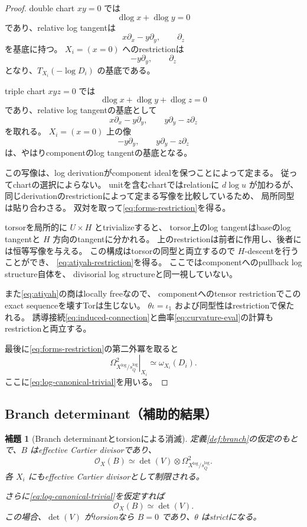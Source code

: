 \documentclass[uplatex,dvipdfmx,11pt]{jsarticle}
\numberwithin{equation}{section}
\theoremstyle{plain}
\newtheorem{lemma}[theorem]{補題}
\theoremstyle{definition}
\theoremstyle{remark}
\DeclareMathOperator{\dlog}{dlog}
\newcommand{\OO}{\mathcal O}
\newcommand{\restr}[2]{\left.#1\right|_{#2}}
\begin{document}
\begin{proof}
double chart \(xy=0\) では
\[
\dlog x+\dlog y=0
\]
であり、relative log tangentは
\[
x\partial_x-y\partial_y,\qquad\partial_z
\]
を基底に持つ。
\(X_i=(x=0)\) へのrestrictionは
\[
-y\partial_y,\qquad\partial_z
\]
となり、\(T_{X_i}(-\log D_i)\) の基底である。

triple chart \(xyz=0\) では
\[
\dlog x+\dlog y+\dlog z=0
\]
であり、relative log tangentの基底として
\[
x\partial_x-y\partial_y,\qquad
y\partial_y-z\partial_z
\]
を取れる。
\(X_i=(x=0)\) 上の像
\[
-y\partial_y,\qquad
y\partial_y-z\partial_z
\]
は、やはりcomponentのlog tangentの基底となる。

この写像は、log derivationがcomponent idealを保つことによって定まる。
従ってchartの選択によらない。
unitを含むchartではrelationに \(d\log u\) が加わるが、
同じderivationのrestrictionによって定まる写像を比較しているため、
局所同型は貼り合わさる。
双対を取って\eqref{eq:forms-restriction}を得る。

torsorを局所的に \(U\times H\) とtrivializeすると、
torsor上のlog tangentはbaseのlog tangentと \(H\) 方向のtangentに分かれる。
上のrestrictionは前者に作用し、後者には恒等写像を与える。
この構成はtorsorの同型と両立するので \(H\)-descentを行うことができ、
\eqref{eq:atiyah-restriction}を得る。
ここではcomponentへのpullback log structure自体を、
divisorial log structureと同一視していない。

また\eqref{eq:atiyah}の商はlocally freeなので、
componentへのtensor restrictionでこのexact sequenceを壊すTorは生じない。
\(\theta\iota=\iota_1\) および同型性はrestrictionで保たれる。
誘導接続\eqref{eq:induced-connection}と曲率\eqref{eq:curvature-eval}の計算も
restrictionと両立する。

最後に\eqref{eq:forms-restriction}の第二外冪を取ると
\[
\restr{\Omega^2_{X^{\log}/s_Q^{\log}}}{X_i}
\simeq\omega_{X_i}(D_i).
\]
ここに\eqref{eq:log-canonical-trivial}を用いる。
\end{proof}

\subsection{Branch determinant（補助的結果）}

\begin{lemma}[Branch determinantとtorsionによる消滅]
\label{lem:branch}
定義\ref{def:branch}の仮定のもとで、\(B\) はeffective Cartier divisorであり、
\begin{equation}
\label{eq:branch-line}
\OO_X(B)\simeq
\det(V)\otimes\Omega^2_{X^{\log}/s_Q^{\log}}.
\end{equation}
各 \(X_i\) にもeffective Cartier divisorとして制限される。

さらに\eqref{eq:log-canonical-trivial}を仮定すれば
\[
\OO_X(B)\simeq\det(V).
\]
この場合、\(\det(V)\) がtorsionなら \(B=0\) であり、\(\theta\) はstrictになる。
\end{lemma}
\end{document}
